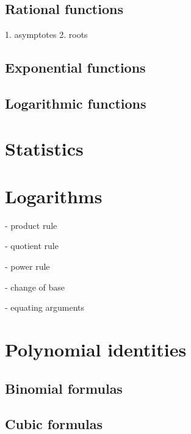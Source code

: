 \documentclass{article}
\begin{document}
\subsection{Rational functions}
1. asymptotes
2. roots
\subsection{Exponential functions}
\subsection{Logarithmic functions}
\section{Statistics}
\section{Logarithms}
- product rule
\begin{equation}
\end{equation}

- quotient rule
\begin{equation}
\end{equation}

- power rule
\begin{equation}
\end{equation}

- change of base
\begin{equation}
\end{equation}

- equating arguments
\begin{equation}
\end{equation}

\section{Polynomial identities}
\subsection{Binomial formulas}


\subsection{Cubic formulas}
\end{document}
